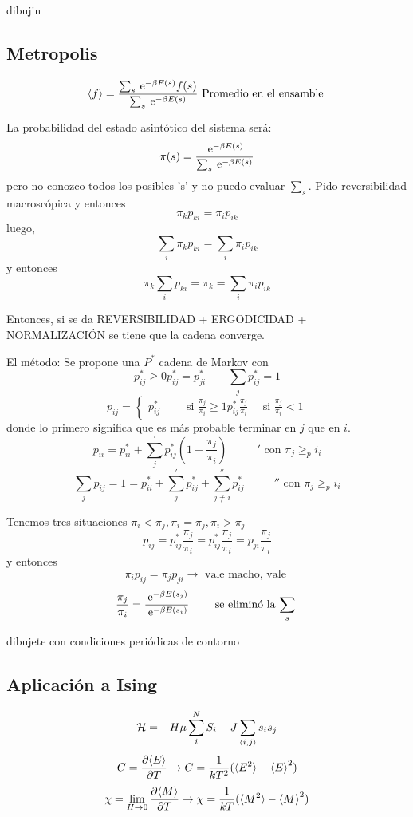 \documentclass[10pt,oneside]{CBFT_book}
\begin{document}
dibujin

\subsection{Metropolis}

\[
	\braket{f} = \frac{\sum_s \:\mathrm{e}^{-\beta E(s)} f(s) }{\sum_s \:\mathrm{e}^{-\beta E(s)} } 
	\text{ Promedio en el ensamble } 
\]

La probabilidad del estado asintótico del sistema será:
\[
	\pi(s) = \frac{ \:\mathrm{e}^{-\beta E(s)} }{\sum_s \:\mathrm{e}^{-\beta E(s)} } 
\]
pero no conozco todos los posibles 's' y no puedo evaluar $\sum_s$.
Pido reversibilidad macroscópica y entonces
\[
	\pi_k p_{ki} = \pi_i p_{ik}
\]
luego,
\[
	\sum_i \pi_k p_{ki} = \sum_i \pi_i p_{ik}
\]
y entonces
\[
	\pi_k \sum_i  p_{ki} = \pi_k = \sum_i \pi_i p_{ik}
\]

Entonces, si se da 
REVERSIBILIDAD + ERGODICIDAD + NORMALIZACIÓN
se tiene que la cadena converge.

El método:
Se propone una $P^*$ cadena de Markov con 
\[
	p_{ij}^* \geq 0 p_{ij}^* = p_{ji}^* \qquad \sum_j p_{ij}^* = 1
\]
\[
	p_{ij} = \begin{cases}
	          p_{ij}^*	\quad \quad \text{ si }  \frac{\pi_j}{\pi_i} \geq 1
	          p_{ij}^*\frac{\pi_j}{\pi_i} \quad \text{ si }  \frac{\pi_j}{\pi_i}< 1
	         \end{cases}
\]
donde lo primero significa que es más probable terminar en $j$ que en $i$.
\[
	p_{ii} = p_{ii}^* + \sum_j^{'} p_{ij}^*( 1 - \frac{\pi_j}{\pi_i} ) \qquad 
	\text{ $'$ con } \pi_j \geq _pi_i 
\]
\[
	\sum_j p_{ij} = 1 = p_{ii}^* + \sum_j^{'} p_{ij}^*  + \sum_{j\neq i}^{''} p_{ij}^* \qquad 
	\text{ $''$ con } \pi_j \geq _pi_i 
\]

Tenemos tres situaciones $ \pi_i < \pi_j , \pi_i = \pi_j, \pi_i > \pi_j$
\[
	p_{ij} = p_{ij}^* \frac{\pi_j}{\pi_i} = p_{ij}^*\frac{\pi_j}{\pi_i} = p_{ji} \frac{\pi_j}{\pi_i}
\]
y entonces
\[
	\pi_i p_{ij} = \pi_j p_{ji} \to \text{ vale macho, vale }
\]
\[
	\frac{\pi_j}{\pi_i} = \frac{\:\mathrm{e}^{-\beta E(s_j)}}{\:\mathrm{e}^{-\beta E(s_i)}} 
	\qquad \text{ se eliminó la $\sum_s$ }
\]

dibujete con condiciones periódicas de contorno

\subsection{Aplicación a Ising}

\[
	\mathcal{H} = -H \mu \sum_i^N S_i - J \sum_{\braket{i,j}} s_i s_j
\]
\[
	C = \frac{\partial^{\hspace{-0.05em}} {\braket{E}}}{\partial {T}^{\hspace{-0.05em}}} \rightarrow C = \frac{1}{kT^ 2}(\braket{E^2}-\braket{E}^2)
\]
\[
	\chi = \lim_{H\to 0} \frac{\partial^{\hspace{-0.05em}} {\braket{M}}}{\partial {T}^{\hspace{-0.05em}}} \rightarrow \chi = \frac{1}{kT}(\braket{M^2}-\braket{M}^2)
\]
\end{document}
